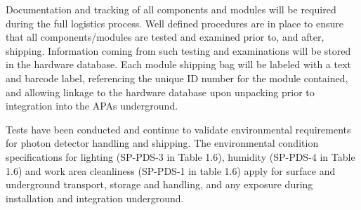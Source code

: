 Documentation and tracking of all components and  modules will be required during the full logistics process. Well defined procedures are in place to ensure that all components/modules are tested and examined prior to, and after, shipping. Information coming from such testing and examinations will be stored in the  hardware database.  Each  module shipping bag will be labeled with a text and barcode label, referencing the unique ID number for the module contained, and allowing linkage to the hardware database upon unpacking prior to integration into the APAs underground.

Tests have been conducted and continue to validate environmental requirements for photon detector handling and shipping. The environmental condition specifications for lighting (SP-PDS-3 in Table 1.6), humidity (SP-PDS-4 in Table 1.6) and work area cleanliness (SP-PDS-1 in table 1.6)
apply for surface and underground transport, storage and handling, and any exposure during installation and integration underground. 




